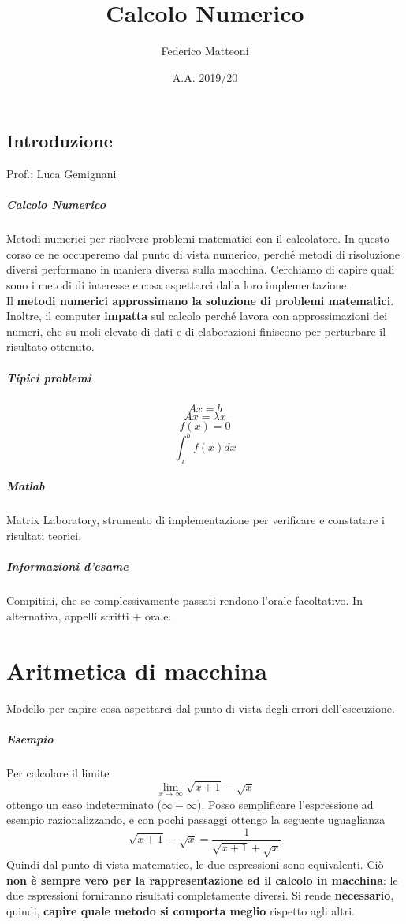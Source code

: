 \documentclass[10pt]{book}
\begin{document}
\renewcommand*\contentsname{Indice}
\title{Calcolo Numerico}
\author{Federico Matteoni}
\date{A.A. 2019/20}
\maketitle
\tableofcontents
\pagebreak
\section*{Introduzione}
Prof.: Luca Gemignani
\paragraph{Calcolo Numerico} Metodi numerici per risolvere problemi matematici con il calcolatore. In questo corso ce ne occuperemo dal punto di vista numerico, perché metodi di risoluzione diversi performano in maniera diversa sulla macchina. Cerchiamo di capire quali sono i metodi di interesse e cosa aspettarci dalla loro implementazione.\\
Il \textbf{metodi numerici approssimano la soluzione di problemi matematici}.\\
Inoltre, il computer \textbf{impatta} sul calcolo perché lavora con approssimazioni dei numeri, che su moli elevate di dati e di elaborazioni finiscono per perturbare il risultato ottenuto.
\paragraph{Tipici problemi} $$Ax = b$$ $$Ax = \lambda x$$ $$f(x) = 0$$ $$\int_a^bf(x) dx$$
\paragraph{Matlab} Matrix Laboratory, strumento di implementazione per verificare e constatare i risultati teorici.
\paragraph{Informazioni d'esame} Compitini, che se complessivamente passati rendono l'orale facoltativo. In alternativa, appelli scritti + orale.
\pagebreak
\chapter{Aritmetica di macchina}
Modello per capire cosa aspettarci dal punto di vista degli errori dell'esecuzione.
\paragraph{Esempio} Per calcolare il limite $$\lim_{x\to\infty} \sqrt{x + 1} - \sqrt{x}$$ ottengo un caso indeterminato ($\infty - \infty$). Posso semplificare l'espressione ad esempio razionalizzando, e con pochi passaggi ottengo la seguente uguaglianza $$\sqrt{x + 1} - \sqrt{x} = \frac{1}{\sqrt{x + 1} + \sqrt{x}}$$ Quindi dal punto di vista matematico, le due espressioni sono equivalenti. Ciò \textbf{non è sempre vero per la rappresentazione ed il calcolo in macchina}: le due espressioni forniranno risultati completamente diversi. Si rende \textbf{necessario}, quindi, \textbf{capire quale metodo si comporta meglio} rispetto agli altri.
\end{document}
